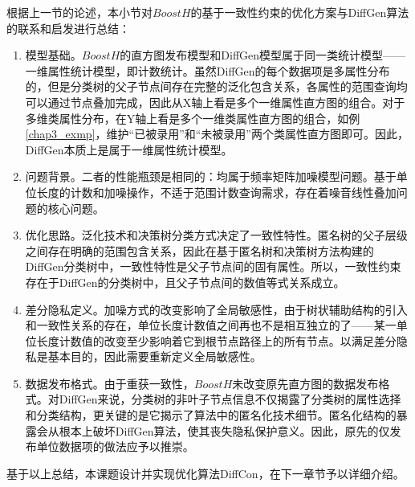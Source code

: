 根据上一节的论述，本小节对$BoostH$的基于一致性约束的优化方案与DiffGen算法的联系和启发进行总结：
\begin{enumerate}
	\item 模型基础。$BoostH$的直方图发布模型和DiffGen模型属于同一类统计模型——一维属性统计模型，即计数统计。虽然DiffGen的每个数据项是多属性分布的，但是分类树的父子节点间存在完整的泛化包含关系，各属性的范围查询均可以通过节点叠加完成，因此从X轴上看是多个一维属性直方图的组合。对于多维类属性分布，在Y轴上看是多个一维类属性直方图的组合，如例\ref{chap3_exmp}，维护“已被录用”和“未被录用”两个类属性直方图即可。因此，DiffGen本质上是属于一维属性统计模型。
	\item 问题背景。二者的性能瓶颈是相同的：均属于频率矩阵加噪模型问题。基于单位长度的计数和加噪操作，不适于范围计数查询需求，存在着噪音线性叠加问题的核心问题。
	\item 优化思路。泛化技术和决策树分类方式决定了一致性特性。匿名树的父子层级之间存在明确的范围包含关系，因此在基于匿名树和决策树方法构建的DiffGen分类树中，一致性特性是父子节点间的固有属性。所以，一致性约束存在于DiffGen的分类树中，且父子节点间的数值等式关系成立。
	\item 差分隐私定义。加噪方式的改变影响了全局敏感性，由于树状辅助结构的引入和一致性关系的存在，单位长度计数值之间再也不是相互独立的了——某一单位长度计数值的改变至少影响着它到根节点路径上的所有节点。以满足差分隐私是基本目的，因此需要重新定义全局敏感性。
	\item 数据发布格式。由于重获一致性，$BoostH$未改变原先直方图的数据发布格式。对DiffGen来说，分类树的非叶子节点信息不仅揭露了分类树的属性选择和分类结构，更关键的是它揭示了算法中的匿名化技术细节。匿名化结构的暴露会从根本上破坏DiffGen算法，使其丧失隐私保护意义。因此，原先的仅发布单位数据项的做法应予以推崇。
	
\end{enumerate}

基于以上总结，本课题设计并实现优化算法DiffCon，在下一章节予以详细介绍。